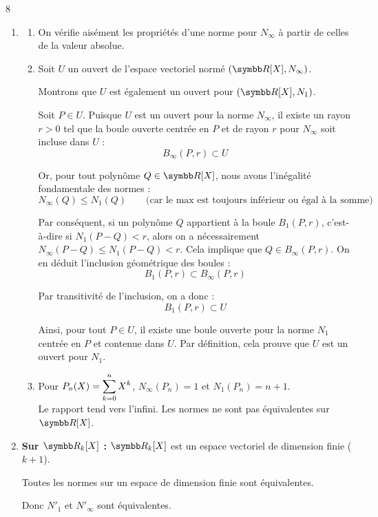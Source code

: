 \newpage
\begin{correction}{8}
\begin{enumerate}
    \item
    \begin{enumerate}
        \item On vérifie aisément les propriétés d'une norme pour $N_\infty$ à partir de celles de la valeur absolue.
        \item Soit $U$ un ouvert de l'espace vectoriel normé $(\R[X], N_\infty)$.

        Montrons que $U$ est également un ouvert pour $(\R[X], N_1)$.

        Soit $P \in U$. Puisque $U$ est un ouvert pour la norme $N_\infty$, il existe un rayon $r > 0$ tel que la boule ouverte centrée en $P$ et de rayon $r$ pour $N_\infty$ soit incluse dans $U$ :
        \[ B_\infty(P, r) \subset U \]

        Or, pour tout polynôme $Q \in \R[X]$, nous avons l'inégalité fondamentale des normes :
        \[ N_\infty(Q) \leqslant N_1(Q) \qquad \text{(car le max est toujours inférieur ou égal à la somme)} \]

        Par conséquent, si un polynôme $Q$ appartient à la boule $B_1(P, r)$, c'est-à-dire si $N_1(P - Q) < r$, alors on a nécessairement $N_\infty(P - Q) \leqslant N_1(P - Q) < r$. Cela implique que $Q \in B_\infty(P, r)$. On en déduit l'inclusion géométrique des boules :
        \[ B_1(P, r) \subset B_\infty(P, r) \]

        Par transitivité de l'inclusion, on a donc :
        \[ B_1(P, r) \subset U \]

        Ainsi, pour tout $P \in U$, il existe une boule ouverte pour la norme $N_1$ centrée en $P$ et contenue dans $U$. Par définition, cela prouve que $U$ est un ouvert pour $N_1$.
        \item Pour $P_n(X) = \displaystyle\sum_{k=0}^n X^k$, $N_\infty(P_n) = 1$ et $N_1(P_n) = n+1$. \\
            Le rapport tend vers l'infini. Les normes ne sont pas équivalentes sur $\R[X]$.
    \end{enumerate}

    \item \textbf{Sur $\R_k[X]$ :}
    $\R_k[X]$ est un espace vectoriel de dimension finie ($k+1$).

    Toutes les normes sur un espace de dimension finie sont équivalentes.

    Donc $N'_1$ et $N'_\infty$ sont équivalentes.
\end{enumerate}
\end{correction}

